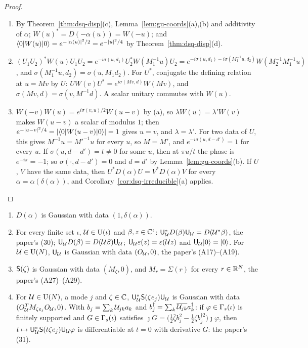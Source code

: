 \begin{veteenv}
\begin{proof}
\begin{enumerate}
\item[(a)] By Theorem~\ref{thm:dsq-disp}(c), Lemma~\ref{lem:gu-coords}(a),(b) and additivity of $\alpha$; $W(u)^*=D(-\alpha(u))=W(-u)$; and
$\langle0\rvert W(u)\lvert 0\rangle=e^{-\lvert\alpha(u)\rvert^2/2}=e^{-\lvert u\rvert^2/4}$ by Theorem~\ref{thm:dsq-disp}(d).
\item[(b)] $(U_1U_2)^*W(u)U_1U_2=e^{-i\sigma(u,d_1)}U_2^*W(M_1^{-1}u)U_2=e^{-i\sigma(u,d_1)-i\sigma(M_1^{-1}u,d_2)}W(M_2^{-1}M_1^{-1}u)$, and
$\sigma(M_1^{-1}u,d_2)=\sigma(u,M_1d_2)$. For $U^*$, conjugate the defining relation at $u=Mv$ by $U$: $UW(v)U^*=e^{i\sigma(Mv,d)}W(Mv)$, and
$\sigma(Mv,d)=\sigma(v,M^{-1}d)$. A scalar unitary commutes with $W(u)$.
\item[(c)] $W(-v)W(u)=e^{i\sigma(v,u)/2}W(u-v)$ by (a), so $\lambda W(u)=\lambda'W(v)$ makes $W(u-v)$ a scalar of modulus $1$; then
$e^{-\lvert u-v\rvert^2/4}=\lvert\langle0\rvert W(u-v)\lvert 0\rangle\rvert=1$ gives $u=v$, and $\lambda=\lambda'$. For two data of $U$, this gives
$M^{-1}u=M'^{-1}u$ for every $u$, so $M=M'$, and $e^{-i\sigma(u,d-d')}=1$ for every $u$. If $\sigma(u,d-d')=t\ne0$ for some $u$, then at
$\pi u/t$ the phase is $e^{-i\pi}=-1$; so $\sigma(\cdot,d-d')=0$ and $d=d'$ by Lemma~\ref{lem:gu-coords}(b). If $U$, $V$ have the same
data, then $U^*D(\alpha)U=V^*D(\alpha)V$ for every $\alpha=\alpha(\delta(\alpha))$, and Corollary~\ref{cor:dsq-irreducible}(a)
applies.\qedhere
\end{enumerate}
\end{proof}

\begin{theorem}\label{thm:gu-implement}
\begin{enumerate}
\item[(a)] $D(\alpha)$ is Gaussian with data $(1,\delta(\alpha))$.
\item[(b)] For every finite set $\iota$, $\mathcal U\in\mathrm U(\iota)$ and $\beta,z\in\mathbb C^\iota$: $\mathsf U_\mathcal U^*D(\beta)\mathsf U_\mathcal U=D(\mathcal U^*\beta)$, the paper's (30);
$\mathsf U_\mathcal U D(\beta)=D(\mathcal U\beta)\mathsf U_\mathcal U$; $\mathsf U_\mathcal U\varepsilon(z)=\varepsilon(\mathcal U z)$ and $\mathsf U_\mathcal U\lvert 0\rangle=\lvert 0\rangle$. For $\mathcal U\in\mathrm{U}(N)$, $\mathsf U_\mathcal U$ is Gaussian with
data $(O_\mathcal U,0)$, the paper's (A17)--(A19).
\item[(c)] $\mathsf S(\zeta)$ is Gaussian with data $(M_\zeta,0)$, and $M_r=\Sigma(r)$ for every $r\in\mathbb R^N$, the paper's (A27)--(A29).
\item[(d)] For $\mathcal U\in\mathrm{U}(N)$, a mode $j$ and $\zeta\in\mathbb C$, $\mathsf U_\mathcal U^*\mathsf S(\zeta e_j)\mathsf U_\mathcal U$ is Gaussian with data
$(O_\mathcal U^TM_{\zeta e_j}O_\mathcal U,0)$. With $b_j=\sum_k\mathcal U_{jk}a_k$ and $b_j^\dagger=\sum_k\overline{\mathcal U_{jk}}a_k^\dagger$: if $\varphi\in\Gamma_s(\iota)$ is finitely
supported and $G\in\Gamma_s(\iota)$ satisfies $\jmath G=\bigl(\tfrac12\bar\zeta b_j^2-\tfrac12\zeta b_j^{\dagger2}\bigr)\jmath\varphi$, then
$t\mapsto\mathsf U_\mathcal U^*\mathsf S(t\zeta e_j)\mathsf U_\mathcal U\varphi$ is differentiable at $t=0$ with derivative $G$: the paper's (31).
\end{enumerate}
\end{theorem}


\end{veteenv}
